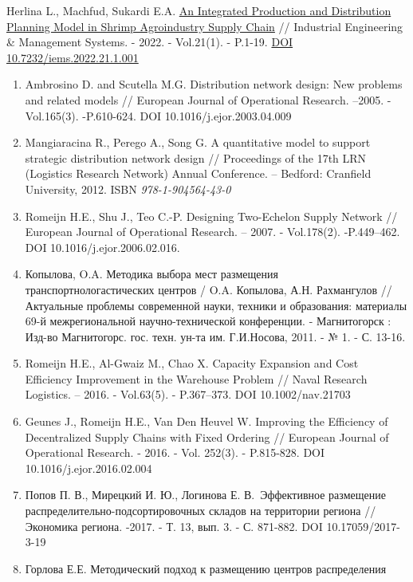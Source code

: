 Herlina L., Machfud, Sukardi E.A.
\href{http://www.iemsjl.org/journal/article.php?code=82679}{An
Integrated Production and Distribution Planning Model in Shrimp
Agroindustry Supply Chain} // Industrial Engineering \& Management
Systems. - 2022. - Vol.21(1). - P.1-19.
\href{https://doi.org/10.7232/iems.2022.21.1.001}{DOI
10.7232/iems.2022.21.1.001}

\begin{enumerate}
\def\labelenumi{\arabic{enumi}.}
\setcounter{enumi}{6}
\item
  Ambrosino D. and Scutella M.G. Distribution network design: New
  problems and related models // European Journal of Operational
  Research. --2005. -Vol.165(3). -P.610-624. DOI
  10.1016/j.ejor.2003.04.009
\item
  Mangiaracina R., Perego A., Song G. A quantitative model to support
  strategic distribution network design // Proceedings of the 17th LRN
  (Logistics Research Network) Annual Conference. -- Bedford: Cranfield
  University, 2012. ISBN \emph{978-1-904564-43-0}
\item
  Romeijn H.E., Shu J., Teo C.-P. Designing Two-Echelon Supply Network
  // European Journal of Operational Research. -- 2007. - Vol.178(2).
  -P.449--462. DOI 10.1016/j.ejor.2006.02.016.
\item
  Копылова, O.A. Методика выбора мест размещения
  транспортнологастических центров / O.A. Копылова, А.Н. Рахмангулов //
  Актуальные проблемы современной науки, техники и образования:
  материалы 69-й межрегиональной научно-технической конференции. -
  Магнитогорск : Изд-во Магнитогорс. гос. техн. ун-та им. Г.И.Носова,
  2011. - № 1. - С. 13-16.
\item
  Romeijn H.E., Al-Gwaiz M., Chao X. Capacity Expansion and Cost
  Efficiency Improvement in the Warehouse Problem // Naval Research
  Logistics. -- 2016. - Vol.63(5). - P.367--373. DOI 10.1002/nav.21703
\item
  Geunes J., Romeijn H.E., Van Den Heuvel W. Improving the Efficiency of
  Decentralized Supply Chains with Fixed Ordering // European Journal of
  Operational Research. - 2016. - Vol. 252(3). - P.815-828. DOI
  10.1016/j.ejor.2016.02.004
\item
  Попов П. В., Мирецкий И. Ю., Логинова Е. В.~Эффективное размещение
  распределительно-подсортировочных складов на территории региона //
  Экономика региона. -2017. - Т. 13, вып. 3. - С. 871-882. DOI
  10.17059/2017-3-19
\item
  Горлова Е.Е. Методический подход к размещению центров распределения

\end{enumerate}
